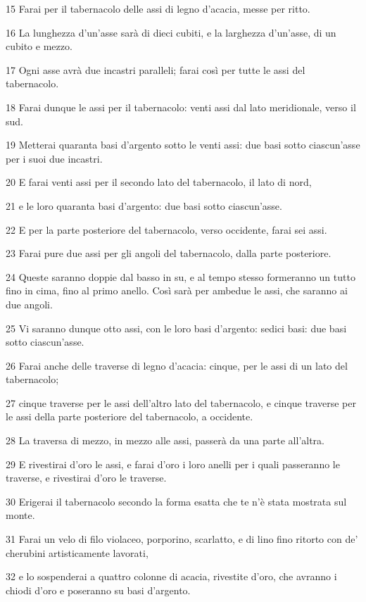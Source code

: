 \par 15 Farai per il tabernacolo delle assi di legno d'acacia, messe per ritto.
\par 16 La lunghezza d'un'asse sarà di dieci cubiti, e la larghezza d'un'asse, di un cubito e mezzo.
\par 17 Ogni asse avrà due incastri paralleli; farai così per tutte le assi del tabernacolo.
\par 18 Farai dunque le assi per il tabernacolo: venti assi dal lato meridionale, verso il sud.
\par 19 Metterai quaranta basi d'argento sotto le venti assi: due basi sotto ciascun'asse per i suoi due incastri.
\par 20 E farai venti assi per il secondo lato del tabernacolo, il lato di nord,
\par 21 e le loro quaranta basi d'argento: due basi sotto ciascun'asse.
\par 22 E per la parte posteriore del tabernacolo, verso occidente, farai sei assi.
\par 23 Farai pure due assi per gli angoli del tabernacolo, dalla parte posteriore.
\par 24 Queste saranno doppie dal basso in su, e al tempo stesso formeranno un tutto fino in cima, fino al primo anello. Così sarà per ambedue le assi, che saranno ai due angoli.
\par 25 Vi saranno dunque otto assi, con le loro basi d'argento: sedici basi: due basi sotto ciascun'asse.
\par 26 Farai anche delle traverse di legno d'acacia: cinque, per le assi di un lato del tabernacolo;
\par 27 cinque traverse per le assi dell'altro lato del tabernacolo, e cinque traverse per le assi della parte posteriore del tabernacolo, a occidente.
\par 28 La traversa di mezzo, in mezzo alle assi, passerà da una parte all'altra.
\par 29 E rivestirai d'oro le assi, e farai d'oro i loro anelli per i quali passeranno le traverse, e rivestirai d'oro le traverse.
\par 30 Erigerai il tabernacolo secondo la forma esatta che te n'è stata mostrata sul monte.
\par 31 Farai un velo di filo violaceo, porporino, scarlatto, e di lino fino ritorto con de' cherubini artisticamente lavorati,
\par 32 e lo sospenderai a quattro colonne di acacia, rivestite d'oro, che avranno i chiodi d'oro e poseranno su basi d'argento.
